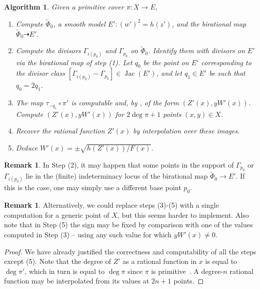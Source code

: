 \documentclass[a4paper,twoside,english]{amsart}
\theoremstyle{plain}
\newtheorem{algorithm}[theorem]{Algorithm}
\theoremstyle{definition}
\newtheorem{remark}[theorem]{Remark}
\begin{document}
\begin{algorithm}\label{algo: complementary map}
    Given a primitive cover $\pi : X \to E$,
    \begin{enumerate}
        \item Compute $\tilde{\Phi}_0$, a smooth model $E' : (w')^2 = h(z')$, and the birational map $\tilde{\Phi}_0 \dashrightarrow E'$.
        \item 
        Compute the divisors $\Gamma_{i(p_0)}$ and $\Gamma_{p_0}$ on $\tilde{\Phi}_0$. Identify them with divisors on $E'$ via the birational map of step (1). Let $q_0$ be the point on $E'$ corresponding to the divisor class $[\Gamma_{i(p_0)}-\Gamma_{p_0}] \in \operatorname{Jac}(E')$,
        and let $q_1 \in E'$ be such that $q_0=2q_1$. 
        \item The map $\tau_{-q_1} \circ \pi'$ is computable and, by , of the form $(Z'(x), y W'(x))$.
        Compute $(Z'(x), y W'(x))$ for $2\deg\pi + 1$ points $(x,y) \in X$.
        \item Recover the rational function $Z'(x)$ by interpolation over these images.
        \item Deduce $W'(x) = \pm \sqrt{ h(Z'(x)) / F(x) }$.
    \end{enumerate}
\end{algorithm}

\begin{remark}
    In Step (2), it may happen that some points in the support of $\Gamma_{p_0}$ or $\Gamma_{i(p_0)}$ lie in the (finite) indeterminacy locus of the birational map $\tilde{\Phi}_0 \to E'$. If this is the case, one may simply use a different base point $p_0$.
\end{remark}


\begin{remark}
Alternatively, we could replace steps (3)-(5) with a single computation for a generic point of $X$, but this seems harder to implement. Also note that in Step (5) the sign may be fixed by comparison with one of the values computed in Step (3) -- using any such value for which $yW'(x) \neq 0$.
\end{remark}
\begin{proof}
    We have already justified the correctness and computability of all the steps except (5). Note that the degree of $Z'$ as a rational function in $x$ is equal to $\deg \pi'$, which in turn is equal to $\deg \pi$ since $\pi$ is primitive~\cite[p.~155]{freyCurvesGenus21991}. A degree-$n$ rational function may be interpolated from its values at $2n+1$ points.
\end{proof}
\end{document}

